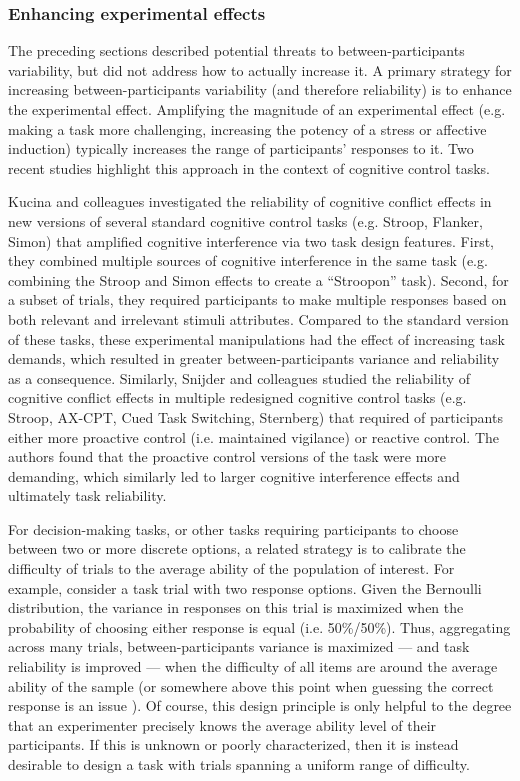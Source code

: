 \documentclass[a4paper,notitlepage,12pt]{article}
\begin{document}
\subsubsection{Enhancing experimental effects}

The preceding sections described potential threats to between-participants variability, but did not address how to actually increase it. A primary strategy for increasing between-participants variability (and therefore reliability) is to enhance the experimental effect. Amplifying the magnitude of an experimental effect (e.g. making a task more challenging, increasing the potency of a stress or affective induction) typically increases the range of participants' responses to it. Two recent studies highlight this approach in the context of cognitive control tasks.  

Kucina and colleagues \cite{kucina2022solution} investigated the reliability of cognitive conflict effects in new versions of several standard cognitive control tasks (e.g. Stroop, Flanker, Simon) that amplified cognitive interference via two task design features. First, they combined multiple sources of cognitive interference in the same task (e.g. combining the Stroop and Simon effects to create a ``Stroopon'' task). Second, for a subset of trials, they required participants to make multiple responses based on both relevant and irrelevant stimuli attributes. Compared to the standard version of these tasks, these experimental manipulations had the effect of increasing task demands, which resulted in greater between-participants variance and reliability as a consequence. Similarly, Snijder and colleagues \cite{snijder2022psychometric} studied the reliability of cognitive conflict effects in multiple redesigned cognitive control tasks (e.g. Stroop, AX-CPT, Cued Task Switching, Sternberg) that required of participants either more proactive control (i.e. maintained vigilance) or reactive control. The authors found that the proactive control versions of the task were more demanding, which similarly led to larger cognitive interference effects and ultimately task reliability. 

For decision-making tasks, or other tasks requiring participants to choose between two or more discrete options, a related strategy is to calibrate the difficulty of trials to the average ability of the population of interest. For example, consider a task trial with two response options. Given the Bernoulli distribution, the variance in responses on this trial is maximized when the probability of choosing either response is equal (i.e. 50\%/50\%). Thus, aggregating across many trials, between-participants variance is maximized --- and task reliability is improved --- when the difficulty of all items are around the average ability of the sample \cite{gulliksen1945relation, ferrando2007external} (or somewhere above this point when guessing the correct response is an issue \cite{lord1952relation, feldt1993relationship}). Of course, this design principle is only helpful to the degree that an experimenter  precisely knows the average ability level of their participants. If this is unknown or poorly characterized, then it is instead desirable to design a task with trials spanning a uniform range of difficulty. 
\end{document}
